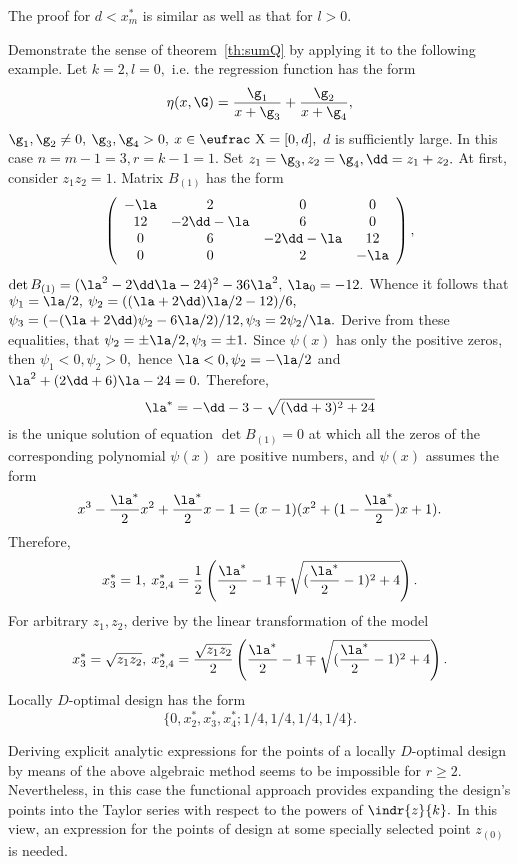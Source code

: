 The proof for $d<x^*_m$ is similar as well as that for $l>0$.
\etproof


Demonstrate the sense of theorem~\ref{th:sumQ} by applying it to the
following example.
\bex
\label{ex:ex2}
Let $k=2,l=0,$ i.e. the regression function has the form
$$
\eta(x,\G)=\frac{\g_1}{x+\g_3}+\frac{\g_2}{x+\g_4},
$$
$\g_1,\g_2\neq 0,\>\g_3,\g_4>0,\>x\in{\mbox{\eufrac X}}=[0,d],$
$d$ is sufficiently large.
In this case $n=m-1=3,r=k-1=1.$
Set $z_1=\g_3,z_2=\g_4,\dd=z_1+z_2.$
At first, consider $z_1z_2=1.$
Matrix $B_{(1)}$ has the form
$$
 \left(
\begin{array}{cccc}
-\la & 2 & 0 & 0 \\
 12 & -2\dd-\la & 6 & 0 \\
 0 & 6 & -2\dd-\la & 12 \\
 0 & 0 & 2 & -\la \end{array} \right),
$$
$\det B_{(1)}=(\la^2-2\dd\la-24)^2-36\la^2,\>\la_0=-12.$
Whence it follows that $\psi_1=\la/2,\>\psi_2=((\la+2\dd)\la/2-12)/6,$
$\psi_3=(-(\la+2\dd)\psi_2-6\la/2)/12, \psi_3=2\psi_2/\la.$
Derive from these equalities, that $\psi_2=\pm\la/2,\psi_3=\pm 1.$
Since $\psi(x)$ has only the positive zeros, then
$\psi_1<0,\psi_2>0,$ hence $\la<0,\psi_2=-\la/2$ and
$\la^2+(2\dd+6)\la-24=0.$
Therefore,
$$
 \la^*=-\dd-3-\sqrt{(\dd+3)^2+24}
$$
is the unique solution of equation $\det B_{(1)}=0$
at which all the zeros of the corresponding polynomial $\psi(x)$ are
positive numbers,
and $\psi(x)$ assumes the form
$$
 x^3-\frac{\la^*}{2}x^2+\frac{\la^*}{2}x-1=
 (x-1)(x^2+(1-\frac{\la^*}{2})x+1).
$$
Therefore,
$$
 x^*_3=1,\>x^*_{2,4}=\frac{1}{2}\left(
 \frac{\la^*}{2}-1\mp\sqrt{(\frac{\la^*}{2}-1)^2+4}\right).
$$
For arbitrary $z_1,z_2$, derive by the linear transformation of the model
$$
 x^*_3=\sqrt{z_1z_2},\>x^*_{2,4}=\frac{\sqrt{z_1z_2}}{2}\left(
 \frac{\la^*}{2}-1\mp\sqrt{(\frac{\la^*}{2}-1)^2+4}\right).
$$
Locally $D$-optimal design has the form
$$
 \{0,x^*_2,x^*_3,x^*_4;1/4,1/4,1/4,1/4\}.
$$
\eex

Deriving explicit analytic expressions for the points of
a locally $D$-optimal design by means of the above algebraic method
seems to be impossible for $r\ge 2$. Nevertheless, in this case the
functional approach provides expanding the design's points into the Taylor
series with respect to the powers of $\indr{z}{k}.$ In this view, an
expression for the points of design at some specially selected point
$z_{(0)}$ is needed.

